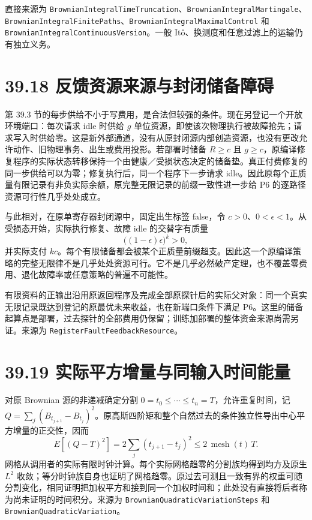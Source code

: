 \documentclass[
  11pt,
  oneside]{book}
\begin{document}
直接来源为 \nolinkurl{BrownianIntegralTimeTruncation}、\nolinkurl{BrownianIntegralMartingale}、\nolinkurl{BrownianIntegralFinitePaths}、\nolinkurl{BrownianIntegralMaximalControl} 和 \nolinkurl{BrownianIntegralContinuousVersion}。一般 Itô、换测度和任意过滤上的运输仍有独立义务。

\section{39.18 反馈资源来源与封闭储备障碍}\label{ux53cdux9988ux8d44ux6e90ux6765ux6e90ux4e0eux5c01ux95edux50a8ux5907ux969cux788d}

第 39.3 节的每步供给不小于写费用，是合法但较强的条件。现在另登记一个开放环境端口：每次请求 idle 时供给 \(g\) 单位资源，即使该次物理执行被故障抢先；请求写入时供给零。这是新外部通道，没有从原封闭源内部创造资源，也没有更改允许动作、旧物理事务、出生或费用投影。若部署时储备 \(R\ge c\) 且 \(g\ge c\)，原编译修复程序的实际状态转移保持一个由健康／受损状态决定的储备垫。真正付费修复的同一步供给可以为零；修复执行后，同一个程序下一步请求 idle。因此原每个正质量有限记录有非负实际余额，原完整无限记录的前缀一致性进一步给 P6 的逐路径资源可行性几乎处处成立。

与此相对，在原单寄存器封闭源中，固定出生标签 false，令 \(c>0\)、\(0<\epsilon<1\)。从受损态开始，实际执行修复、故障 idle 的交替字有质量 \[\bigl((1-\epsilon)\epsilon\bigr)^k>0,\] 并实际支付 \(kc\)。每个有限储备都会被某个正质量前缀超支。因此这一个原编译策略的完整无限律不是几乎处处资源可行。它不是几乎必然破产定理，也不覆盖零费用、退化故障率或任意策略的普遍不可能性。

有限资料的正输出沿用原返回程序及完成全部原探针后的实际父对象：同一个真实无限记录既达到登记的原最优未来收益，也在新端口条件下满足 P6。这里的储备起算点是部署，过去探针的全部费用仍保留；训练加部署的整体资金来源尚需另证。来源为 \nolinkurl{RegisterFaultFeedbackResource}。

\section{39.19 实际平方增量与同输入时间能量}\label{ux5b9eux9645ux5e73ux65b9ux589eux91cfux4e0eux540cux8f93ux5165ux65f6ux95f4ux80fdux91cf}

对原 Brownian 源的非递减确定分割 \(0=t_0\le\cdots\le t_n=T\)，允许重复时间，记 \(Q=\sum_j(B_{t_{j+1}}-B_{t_j})^2\)。原高斯四阶矩和整个自然过去的条件独立性导出中心平方增量的正交性，因而 \[E[(Q-T)^2]=2\sum_j(t_{j+1}-t_j)^2
\le2\,\operatorname{mesh}(t)\,T.\] 网格从调用者的实际有限时钟计算。每个实际网格趋零的分割族均得到均方及原生 \(L^2\) 收敛；等分时钟族自身也证明了网格趋零。原过去可测且一致有界的权重可随分割变化，相同证明把加权平方和接到同一个加权时间和；此处没有直接将后者称为尚未证明的时间积分。来源为 \nolinkurl{BrownianQuadraticVariationSteps} 和 \nolinkurl{BrownianQuadraticVariation}。
\end{document}
